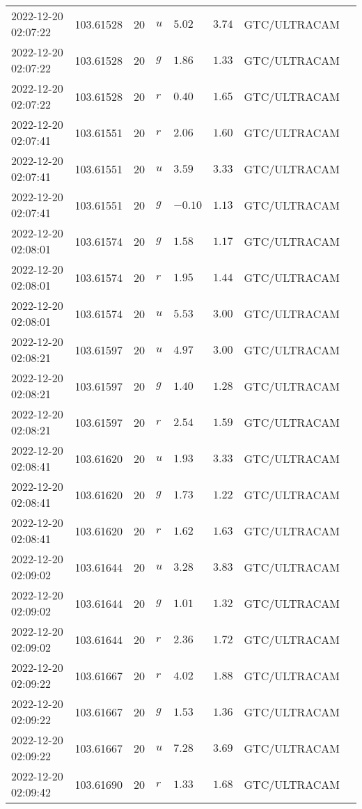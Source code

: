 \documentclass{nature_plusfigure}
\begin{document}
\begin{supplement}
\begin{center}
\begin{longtable}{llllllll}
2022-12-20 02:07:22 & 103.61528 & 20 & $u$ & $5.02$ & $3.74$ & GTC/ULTRACAM &  \\ 
2022-12-20 02:07:22 & 103.61528 & 20 & $g$ & $1.86$ & $1.33$ & GTC/ULTRACAM &  \\ 
2022-12-20 02:07:22 & 103.61528 & 20 & $r$ & $0.40$ & $1.65$ & GTC/ULTRACAM &  \\ 
2022-12-20 02:07:41 & 103.61551 & 20 & $r$ & $2.06$ & $1.60$ & GTC/ULTRACAM &  \\ 
2022-12-20 02:07:41 & 103.61551 & 20 & $u$ & $3.59$ & $3.33$ & GTC/ULTRACAM &  \\ 
2022-12-20 02:07:41 & 103.61551 & 20 & $g$ & $-0.10$ & $1.13$ & GTC/ULTRACAM &  \\ 
2022-12-20 02:08:01 & 103.61574 & 20 & $g$ & $1.58$ & $1.17$ & GTC/ULTRACAM &  \\ 
2022-12-20 02:08:01 & 103.61574 & 20 & $r$ & $1.95$ & $1.44$ & GTC/ULTRACAM &  \\ 
2022-12-20 02:08:01 & 103.61574 & 20 & $u$ & $5.53$ & $3.00$ & GTC/ULTRACAM &  \\ 
2022-12-20 02:08:21 & 103.61597 & 20 & $u$ & $4.97$ & $3.00$ & GTC/ULTRACAM &  \\ 
2022-12-20 02:08:21 & 103.61597 & 20 & $g$ & $1.40$ & $1.28$ & GTC/ULTRACAM &  \\ 
2022-12-20 02:08:21 & 103.61597 & 20 & $r$ & $2.54$ & $1.59$ & GTC/ULTRACAM &  \\ 
2022-12-20 02:08:41 & 103.61620 & 20 & $u$ & $1.93$ & $3.33$ & GTC/ULTRACAM &  \\ 
2022-12-20 02:08:41 & 103.61620 & 20 & $g$ & $1.73$ & $1.22$ & GTC/ULTRACAM &  \\ 
2022-12-20 02:08:41 & 103.61620 & 20 & $r$ & $1.62$ & $1.63$ & GTC/ULTRACAM &  \\ 
2022-12-20 02:09:02 & 103.61644 & 20 & $u$ & $3.28$ & $3.83$ & GTC/ULTRACAM &  \\ 
2022-12-20 02:09:02 & 103.61644 & 20 & $g$ & $1.01$ & $1.32$ & GTC/ULTRACAM &  \\ 
2022-12-20 02:09:02 & 103.61644 & 20 & $r$ & $2.36$ & $1.72$ & GTC/ULTRACAM &  \\ 
2022-12-20 02:09:22 & 103.61667 & 20 & $r$ & $4.02$ & $1.88$ & GTC/ULTRACAM &  \\ 
2022-12-20 02:09:22 & 103.61667 & 20 & $g$ & $1.53$ & $1.36$ & GTC/ULTRACAM &  \\ 
2022-12-20 02:09:22 & 103.61667 & 20 & $u$ & $7.28$ & $3.69$ & GTC/ULTRACAM &  \\ 
2022-12-20 02:09:42 & 103.61690 & 20 & $r$ & $1.33$ & $1.68$ & GTC/ULTRACAM &  \\ 

\end{longtable}
\end{center}
\end{supplement}
\end{document}
